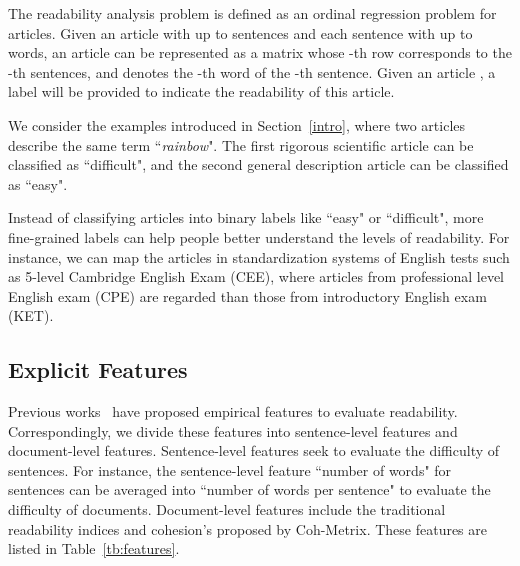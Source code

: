 \documentclass[runningheads]{llncs}
\begin{document}
The readability analysis problem is defined as an ordinal regression problem for articles. Given an article with up to  sentences and each sentence with up to  words, an article can be represented as a matrix  whose -th row  corresponds to the -th sentences, and  denotes the -th word of the -th sentence.
  Given an article , a label will be provided to indicate the readability of this article.

We consider the examples introduced in Section~\ref{intro}, where two articles describe the same term ``\textit{rainbow}". The first rigorous scientific article can be classified as ``difficult", and the second general description article can be classified as ``easy". 

Instead of classifying articles into binary labels like ``easy" or ``difficult", more fine-grained labels can help people better understand the levels of readability. For instance, we can map the articles in standardization systems of English tests such as 5-level Cambridge English Exam (CEE),
where articles from professional level English exam (CPE) are regarded than those from introductory English exam (KET).

\iffalse
{\color{red}
We use the following datasets to study readability.
Regular encyclopedias and simplified encyclopedias~\cite{wikidata}: English Wikipedia is the most delicate and well-defined regular encyclopaedia for explaining certain concepts.
Simple English Wikipedia which is the simplified encyclopedia only uses simple words and easy sentence structures to provide a primary understanding of English learners and kids.
We treat the Simple English Wiki page with label 0, while the English Wiki page with label 1. The confidence value of 0 or 1 can be considered as the readability rating in extreme cases.
+CEE. (But another concern is, why do we need to introduce the datasets in detail for twice? You should consider, say, reform this part to an example that illustrates the problem definition.)
}
\fi










\subsection{Explicit Features} \label{indicator}
  Previous works~\cite{kincaid1975derivation,gibson1998linguistic,heilman2007combining,heilman2008analysis,malvern2012measures,CollinsSurvey,graesser2004coh} have proposed empirical features to evaluate readability. Correspondingly, we divide these features into sentence-level features and document-level features. Sentence-level features seek to evaluate the difficulty of sentences. For instance, the sentence-level feature ``number of words" for sentences can be averaged into ``number of words per sentence" to evaluate the difficulty of documents. Document-level features include the traditional readability indices and cohesion's proposed by Coh-Metrix\cite{graesser2004coh}. These features are listed in Table~\ref{tb:features}.
\end{document}
